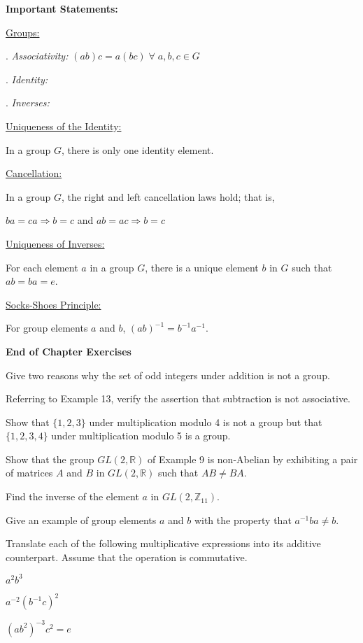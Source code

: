 \documentclass[11pt,largemargins]{homework}
\begin{document}
\maketitle

\textbf{\large{Important Statements:}}

\underline{Groups:}

. \textit{Associativity:} $(ab)c=a(bc) \;\forall\;a,b,c \in G$

. \textit{Identity:}

. \textit{Inverses:}

\underline{Uniqueness of the Identity:}

\quad In a group $G$, there is only one identity element.

\underline{Cancellation:}

\quad In a group $G$, the right and left cancellation laws hold; that is, 

\quad $ba=ca \Rightarrow b=c$ and $ab=ac \Rightarrow b=c$

\underline{Uniqueness of Inverses:}

\quad For each element $a$ in a group $G$, there is a unique element $b$ in $G$ such that $ab=ba=e$.

\underline{Socks-Shoes Principle:}

\quad For group elements $a$ and $b$, $(ab)^{-1}=b^{-1}a^{-1}$.

\hfill

\textbf{\large{End of Chapter Exercises}}

\question
Give two reasons why the set of odd integers under addition is not a group.

\question
Referring to Example 13, verify the assertion that subtraction is not associative.


\question
Show that $\{1, 2, 3\}$ under multiplication modulo 4 is not a group but that $\{1,2,3,4\}$ under multiplication 
modulo 5 is a group.

\question
Show that the group $GL(2, \mathbb{R})$ of Example 9 is non-Abelian by exhibiting a pair of matrices $A$ and $B$ 
in $GL(2, \mathbb{R})$ such that $AB \neq BA$.


\question
Find the inverse of the element $a$ in $GL(2, \mathbb{Z}_{11})$.


\question
Give an example of group elements $a$ and $b$ with the property that $a^{-1}ba\neq b$.

\question
Translate each of the following multiplicative expressions into its additive counterpart. Assume that the operation 
is commutative.

\begin{alphaparts}
    \questionpart
    $a^2b^3$

    \questionpart
    $a^{-2}(b^{-1}c)^2$

    \questionpart
    $(ab^2)^{-3}c^2=e$

\end{alphaparts}
\end{document}
